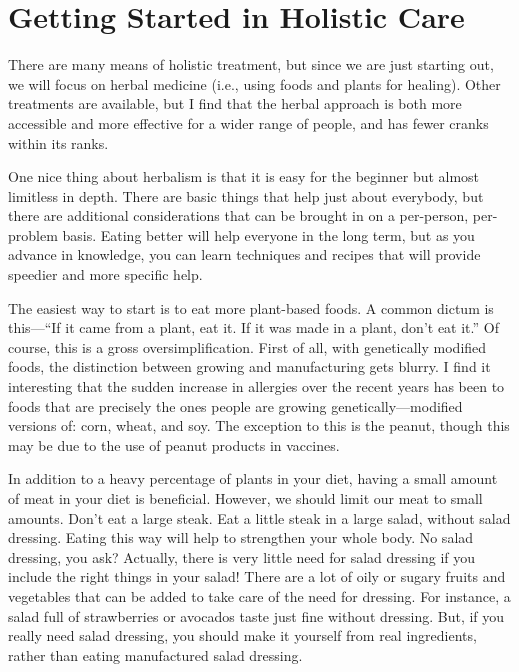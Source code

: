 \section{Getting Started in Holistic Care}

There are many means of holistic treatment, but since we are just
starting out, we will focus on herbal medicine
(i.e., using foods and plants for healing). Other
treatments are available, but I find that the herbal approach is both
more accessible and more effective for a wider range of people, and 
has fewer cranks within its ranks.

One nice thing about herbalism is that it is easy for the beginner but
almost limitless in depth. There are basic things that help just about
everybody, but there are additional considerations that can be brought
in on a per-person, per-problem basis. Eating better will help everyone
in the long term, but as you advance in knowledge, you can learn
techniques and recipes that will provide speedier and more specific
help. 

The easiest way to start is to eat more plant-based foods. A common
dictum is this---``If it came from a plant, eat it. If it
was made in a plant, don't eat it.''  Of
course, this is a gross oversimplification. First of all, with
genetically modified foods, the distinction between
growing and manufacturing gets blurry. I find it interesting that the sudden
increase in allergies over the recent years has been to foods that are
precisely the ones people are growing genetically—modified versions of:
corn, wheat, and soy. The exception to this is the peanut, though
this may be due to the use of peanut products in vaccines. 

In addition to a heavy percentage of plants in your diet,
having a small amount of meat in your diet is beneficial. However, we
should limit our meat to small amounts. Don't eat a
large steak. Eat a little steak in a large salad, without salad
dressing. Eating this way will help to strengthen your whole body.  No
salad dressing, you ask?  Actually, there is very little need for salad
dressing if you include the right things in your salad!  There are a
lot of oily or sugary fruits and vegetables that can be added to take
care of the need for dressing.  For instance, a salad full of
strawberries or avocados taste just fine without dressing.  But, if you
really need salad dressing, you should make it yourself from real
ingredients, rather than eating manufactured salad dressing.

